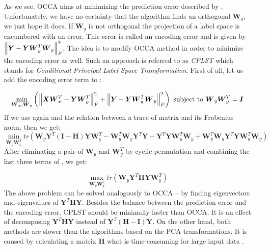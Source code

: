 As we see, OCCA aims at minimizing the prediction error described by . Unfortunately, we have no certainty that the algorithm finds an orthogonal $\boldsymbol{W}_y$, we just hope it does. If $\boldsymbol{W}_y$ is not orthogonal the projection of a label space is encumbered with an error. This error is called an encoding error and is given by $\left\lVert\boldsymbol{Y}-\boldsymbol{Y}\boldsymbol{W}_y^T\boldsymbol{W}_y\right\rVert_{F}^2$. The idea is to modify OCCA method in order to minimize the encoding error as well. Such an approach is referred to as \textit{CPLST} \citep{ChenLin} which stands for \textit{Conditional Principal Label Space Transformation}. First of all, let us add the encoding error term to : 

\begin{equation}\label{eq:cplst5}
    \min_{\boldsymbol{W}_x, \boldsymbol{W}_y} \left(\left\lVert\boldsymbol{X}\boldsymbol{W}_x^T-\boldsymbol{Y}\boldsymbol{W}_y^T\right\rVert_{F}^2 + \left\lVert\boldsymbol{Y}-\boldsymbol{Y}\boldsymbol{W}_y^T\boldsymbol{W}_y\right\rVert_{F}^2\right)  
    \text{  subject to   } \boldsymbol{W}_y\boldsymbol{W}_y^T=\boldsymbol{I}   
\end{equation}
If we use again  and the relation between a trace of matrix and its Frobenius norm, then we get:
\begin{equation}\label{eq:cplst6}
    \min_{\boldsymbol{W}_y\boldsymbol{W}_y^T} tr(\boldsymbol{W}_y\boldsymbol{Y}^T(\boldsymbol{I}-\boldsymbol{H})\boldsymbol{Y}\boldsymbol{W}_y^T-\boldsymbol{W}_y^T\boldsymbol{W}_y\boldsymbol{Y}^T\boldsymbol{Y}-\boldsymbol{Y}^T\boldsymbol{Y}\boldsymbol{W}_y^T\boldsymbol{W}_y+\boldsymbol{W}_y^T\boldsymbol{W}_y\boldsymbol{Y}^T\boldsymbol{Y}\boldsymbol{W}_y^T\boldsymbol{W}_y)  
\end{equation}
After eliminating a pair of $\boldsymbol{W}_y$ and $\boldsymbol{W}_y^T$ by cyclic permutation and combining the last three terms of , we get:

\begin{equation}\label{eq:cplst6}
    \max_{\boldsymbol{W}_y\boldsymbol{W}_y^T} tr(\boldsymbol{W}_y\boldsymbol{Y}^T\boldsymbol{H}\boldsymbol{Y}\boldsymbol{W}_y^T)  
\end{equation}
The above problem can be solved analogously to OCCA -- by finding eigenvectors and eigenvalues of $\boldsymbol{Y}^T\boldsymbol{H}\boldsymbol{Y}$. Besides the balance between the prediction error and the encoding error, CPLST should be minimally faster than OCCA. It is an effect of decomposing $\boldsymbol{Y}^T\boldsymbol{H}\boldsymbol{Y}$ instead of $\boldsymbol{Y}^T(\boldsymbol{H}-\boldsymbol{I})\boldsymbol{Y}$. On the other hand, both methods are slower than the algorithms based on the PCA transformations. It is caused by calculating a matrix $\boldsymbol{H}$ what is time-consuming for large input data \citep{ChenLin}.

